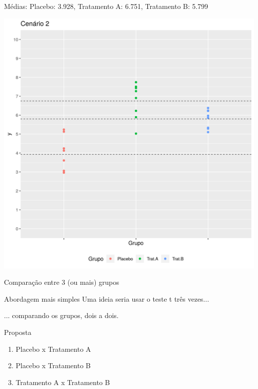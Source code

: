 \documentclass{beamer}
\begin{document}
\begin{frame}{\scriptsize Médias: Placebo: 3.928, Tratamento A: 6.751, Tratamento B: 5.799}
  \begin{center}
    \includegraphics[height=.9\textheight]{Cap13-30/cenario21_medias}

  \end{center}
\end{frame}

\begin{frame}{\scriptsize Comparação entre 3 (ou mais) grupos}
  \begin{block}{Abordagem mais simples}
    \small
    Uma ideia seria usar o teste t três vezes...

    \bigskip
    ... comparando os grupos, dois a dois.
  \end{block}
  \vfill
  \begin{block}{Proposta}
    \begin{enumerate}
      \footnotesize
    \item Placebo x Tratamento A
    \item Placebo x Tratamento B
    \item Tratamento A x Tratamento B
    \end{enumerate}
  \end{block}
\end{frame}
\end{document}
